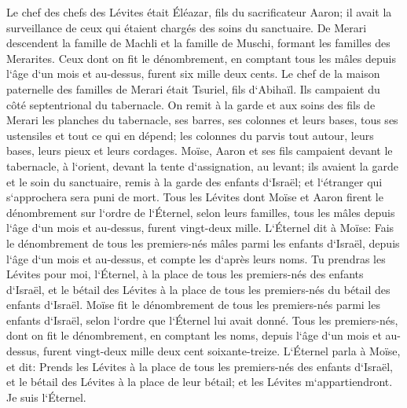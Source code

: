 \verse Le chef des chefs des Lévites était Éléazar, fils du sacrificateur Aaron; il avait la surveillance de ceux qui étaient chargés des soins du sanctuaire. 
\verse De Merari descendent la famille de Machli et la famille de Muschi, formant les familles des Merarites. 
\verse Ceux dont on fit le dénombrement, en comptant tous les mâles depuis l`âge d`un mois et au-dessus, furent six mille deux cents. 
\verse Le chef de la maison paternelle des familles de Merari était Tsuriel, fils d`Abihaïl. Ils campaient du côté septentrional du tabernacle. 
\verse On remit à la garde et aux soins des fils de Merari les planches du tabernacle, ses barres, ses colonnes et leurs bases, tous ses ustensiles et tout ce qui en dépend; 
\verse les colonnes du parvis tout autour, leurs bases, leurs pieux et leurs cordages. 
\verse Moïse, Aaron et ses fils campaient devant le tabernacle, à l`orient, devant la tente d`assignation, au levant; ils avaient la garde et le soin du sanctuaire, remis à la garde des enfants d`Israël; et l`étranger qui s`approchera sera puni de mort. 
\verse Tous les Lévites dont Moïse et Aaron firent le dénombrement sur l`ordre de l`Éternel, selon leurs familles, tous les mâles depuis l`âge d`un mois et au-dessus, furent vingt-deux mille. 
\verse L`Éternel dit à Moïse: Fais le dénombrement de tous les premiers-nés mâles parmi les enfants d`Israël, depuis l`âge d`un mois et au-dessus, et compte les d`après leurs noms. 
\verse Tu prendras les Lévites pour moi, l`Éternel, à la place de tous les premiers-nés des enfants d`Israël, et le bétail des Lévites à la place de tous les premiers-nés du bétail des enfants d`Israël. 
\verse Moïse fit le dénombrement de tous les premiers-nés parmi les enfants d`Israël, selon l`ordre que l`Éternel lui avait donné. 
\verse Tous les premiers-nés, dont on fit le dénombrement, en comptant les noms, depuis l`âge d`un mois et au-dessus, furent vingt-deux mille deux cent soixante-treize. 
\verse L`Éternel parla à Moïse, et dit: 
\verse Prends les Lévites à la place de tous les premiers-nés des enfants d`Israël, et le bétail des Lévites à la place de leur bétail; et les Lévites m`appartiendront. Je suis l`Éternel. 
